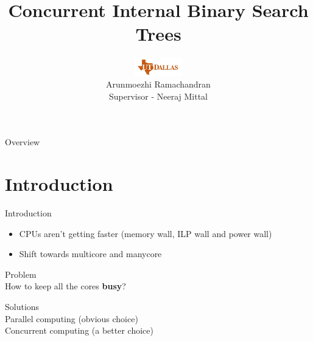 \documentclass{beamer}
\title{Concurrent Internal Binary Search Trees}
\author[Arun]{\includegraphics[height=0.8cm]{figures/utd_logo.jpg}\\
Arunmoezhi Ramachandran \\
Supervisor - Neeraj Mittal\\
}
\institute[UTDallas]{The University of Texas at Dallas}
\date{}
\begin{document}
\begin{frame}
	\titlepage
\end{frame}

		
\begin{frame}{Overview}
	\tableofcontents
\end{frame}

\section{Introduction}
\begin{frame}{Introduction}
\begin{itemize}
\item \small CPUs aren't getting faster (memory wall, ILP wall and power wall)
\item \small Shift towards multicore and manycore
\end{itemize}
\begin{center}
\Large {\color{red} Problem}\\
How to keep all the cores \textbf{busy}?
\end{center}
\pause
\begin{center}
\Large {\color{blue} Solutions}\\
Parallel computing (obvious choice)\\
\pause
Concurrent computing (a better choice)
\end{center}
\end{frame}
\end{document}
